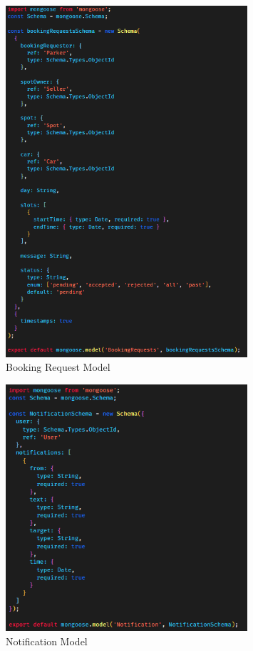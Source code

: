                     \begin{figure}[h]
                        \centering
                        \includegraphics[width=0.8\textwidth]{images/bookingModel.png}
                        \caption{Booking Request Model}
                        \label{fig:bookingModel}
                    \end{figure}


                    \begin{figure}[h]
                        \centering
                        \includegraphics[width=0.8\textwidth]{images/notificationModel.png}
                        \caption{Notification Model}
                        \label{fig:notificationModel}
                    \end{figure}


